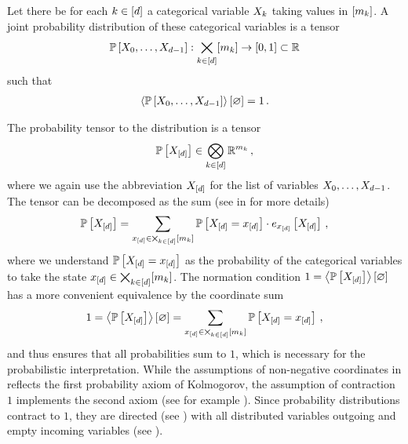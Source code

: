 \begin{definition}
    \label{def:probabilityDistribution} %
    Let there be for each $k\in[d]$ a categorical variable $X_{k}$ taking values in $[m_{k}]$.
    A joint probability distribution of these categorical variables is a tensor
    \begin{align*}
        \mathbb{P}\left[X_{0},\ldots,X_{d-1}\right] : \bigtimes_{k\in[d]}[m_{k}] \rightarrow [0,1] \subset \mathbb{R}
    \end{align*}
    such that
    \begin{align*}
        \left\langle \mathbb{P}\left[X_{0},\ldots,X_{d-1}\right]\right\rangle \left[ \varnothing \right] = 1 \, .
    \end{align*}
\end{definition}

The probability tensor to the distribution is a tensor
\begin{align*}
    \mathbb{P}\left[X_{[d]}\right]\in\bigotimes_{k\in[d]}\mathbb{R}^{m_{k}} \, ,
\end{align*}
where we again use the abbreviation $X_{[d]}$ for the list of variables $X_{0},\ldots,X_{d-1}$.
The tensor can be decomposed as the sum (see  in  for more details)
\begin{align*}
    \mathbb{P}\left[X_{[d]}\right] = \sum_{x_{[d]}\in\bigtimes_{k\in[d]}[m_{k}]} \mathbb{P}\left[X_{[d]}=x_{[d]}\right] \cdot e_{x_{[d]}}\left[X_{[d]}\right] \, ,
\end{align*}
where we understand $\mathbb{P}\left[X_{[d]}=x_{[d]}\right]$ as the probability of the categorical variables to take the state $x_{[d]}\in\bigtimes_{k\in[d]}[m_{k}]$.
The normation condition $1=\left\langle \mathbb{P}\left[X_{[d]}\right]\right\rangle \left[ \varnothing \right]$ has a more convenient equivalence by the coordinate sum
\begin{align*}
    1 = \left\langle \mathbb{P}\left[X_{[d]}\right]\right\rangle \left[ \varnothing \right]
    =  \sum_{x_{[d]}\in\bigtimes_{k\in[d]}[m_{k}]}\mathbb{P}\left[X_{[d]}=x_{[d]}\right] \, ,
\end{align*}
and thus ensures that all probabilities sum to $1$, which is necessary for the probabilistic interpretation.
While the assumptions of non-negative coordinates in  reflects the first probability axiom of Kolmogorov, the assumption of contraction $1$ implements the second axiom (see for example \cite{degroot_probability_2016}).
Since probability distributions contract to $1$, they are directed (see ) with all distributed variables outgoing and empty incoming variables (see ).

